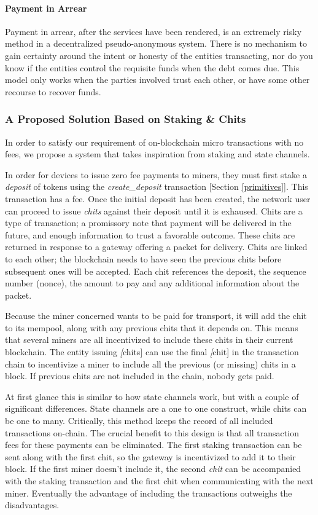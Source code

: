 \documentclass[10pt, nonatbib, nocopyrightspace, reprint]{sigplanconf}
\begin{document}
\paragraph{Payment in Arrear}
Payment in arrear, after the services have been rendered, is an extremely risky method in a decentralized pseudo-anonymous system. There is no mechanism to gain certainty around the intent or honesty of the entities transacting, nor do you know if the entities control the requisite funds when the debt comes due. This model only works when the parties involved trust each other, or have some other recourse to recover funds.

\subsubsection{A Proposed Solution Based on Staking \& Chits}

In order to satisfy our requirement of on-blockchain micro transactions with no fees, we propose a system that takes inspiration from staking and state channels.

In order for devices to issue zero fee payments to miners, they must first stake a \emph{deposit} of tokens using the \emph{create\_deposit} transaction [Section \ref{primitives}]. This transaction has a fee. Once the initial deposit has been created, the network user can proceed to issue \emph{chits} against their deposit until it is exhaused. Chits are a type of transaction; a promissory note that payment will be delivered in the future, and enough information to trust a favorable outcome. These chits are returned in response to a gateway offering a packet for delivery. Chits are linked to each other; the blockchain needs to have seen the previous chits before subsequent ones will be accepted. Each chit references the deposit, the sequence number (nonce), the amount to pay and any additional information about the packet.

Because the miner concerned wants to be paid for transport, it will add the chit to its mempool, along with any previous chits that it depends on. This means that several miners are all incentivized to include these chits in their current blockchain. The entity issuing \emph[chits] can use the final \emph[chit] in the transaction chain to incentivize a miner to include all the previous (or missing) chits in a block. If previous chits are not included in the chain, nobody gets paid.

At first glance this is similar to how state channels work, but with a couple of significant differences. State channels are a one to one construct, while chits can be one to many. Critically, this method keeps the record of all included transactions on-chain. The crucial benefit to this design is that all transaction fees for these payments can be eliminated. The first staking transaction can be sent along with the first chit, so the gateway is incentivized to add it to their block. If the first miner doesn't include it, the second \emph{chit} can be accompanied with the staking transaction and the first chit when communicating with the next miner. Eventually the advantage of including the transactions outweighs the disadvantages.
\end{document}
